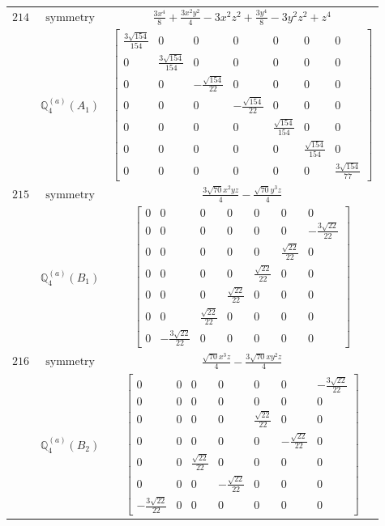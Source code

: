 \documentclass[fleqn,8pt,landscape]{jsarticle}
\begin{document}
\begin{longtable}{ccc}
$ 214 $ & $ \text{symmetry} $ & $ \frac{3 x^{4}}{8} + \frac{3 x^{2} y^{2}}{4} - 3 x^{2} z^{2} + \frac{3 y^{4}}{8} - 3 y^{2} z^{2} + z^{4} $ \\
$  $ & $ \mathbb{Q}_{4}^{(a)}(A_{1}) $ & $ \begin{bmatrix} \frac{3 \sqrt{154}}{154} & 0 & 0 & 0 & 0 & 0 & 0 \\ 0 & \frac{3 \sqrt{154}}{154} & 0 & 0 & 0 & 0 & 0 \\ 0 & 0 & - \frac{\sqrt{154}}{22} & 0 & 0 & 0 & 0 \\ 0 & 0 & 0 & - \frac{\sqrt{154}}{22} & 0 & 0 & 0 \\ 0 & 0 & 0 & 0 & \frac{\sqrt{154}}{154} & 0 & 0 \\ 0 & 0 & 0 & 0 & 0 & \frac{\sqrt{154}}{154} & 0 \\ 0 & 0 & 0 & 0 & 0 & 0 & \frac{3 \sqrt{154}}{77} \end{bmatrix} $ \\ \hline
$ 215 $ & $ \text{symmetry} $ & $ \frac{3 \sqrt{70} x^{2} y z}{4} - \frac{\sqrt{70} y^{3} z}{4} $ \\
$  $ & $ \mathbb{Q}_{4}^{(a)}(B_{1}) $ & $ \begin{bmatrix} 0 & 0 & 0 & 0 & 0 & 0 & 0 \\ 0 & 0 & 0 & 0 & 0 & 0 & - \frac{3 \sqrt{22}}{22} \\ 0 & 0 & 0 & 0 & 0 & \frac{\sqrt{22}}{22} & 0 \\ 0 & 0 & 0 & 0 & \frac{\sqrt{22}}{22} & 0 & 0 \\ 0 & 0 & 0 & \frac{\sqrt{22}}{22} & 0 & 0 & 0 \\ 0 & 0 & \frac{\sqrt{22}}{22} & 0 & 0 & 0 & 0 \\ 0 & - \frac{3 \sqrt{22}}{22} & 0 & 0 & 0 & 0 & 0 \end{bmatrix} $ \\ \hline
$ 216 $ & $ \text{symmetry} $ & $ \frac{\sqrt{70} x^{3} z}{4} - \frac{3 \sqrt{70} x y^{2} z}{4} $ \\
$  $ & $ \mathbb{Q}_{4}^{(a)}(B_{2}) $ & $ \begin{bmatrix} 0 & 0 & 0 & 0 & 0 & 0 & - \frac{3 \sqrt{22}}{22} \\ 0 & 0 & 0 & 0 & 0 & 0 & 0 \\ 0 & 0 & 0 & 0 & \frac{\sqrt{22}}{22} & 0 & 0 \\ 0 & 0 & 0 & 0 & 0 & - \frac{\sqrt{22}}{22} & 0 \\ 0 & 0 & \frac{\sqrt{22}}{22} & 0 & 0 & 0 & 0 \\ 0 & 0 & 0 & - \frac{\sqrt{22}}{22} & 0 & 0 & 0 \\ - \frac{3 \sqrt{22}}{22} & 0 & 0 & 0 & 0 & 0 & 0 \end{bmatrix} $ \\ \hline

\end{longtable}
\end{document}
